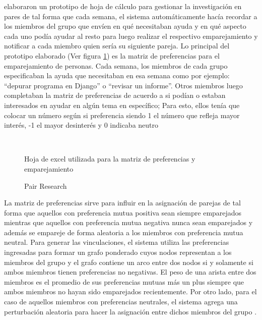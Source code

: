  elaboraron un prototipo de hoja de cálculo para gestionar la investigación en pares de tal forma que cada semana, el sistema automáticamente hacía recordar a los miembros del grupo que envíen en qué necesitaban ayuda y en qué aspecto cada uno podía ayudar al resto para luego realizar el respectivo emparejamiento y notificar a cada miembro quien sería su siguiente pareja. Lo principal del prototipo elaborado (Ver figura \ref{fig:pair_research}) es la matriz de preferencias para el emparejamiento de personas. Cada semana, los miembros de cada grupo especificaban la ayuda que necesitaban en esa semana como por ejemplo: ``depurar programa en Django'' o ``revisar un informe''. Otros miembros luego completaban la matriz de preferencias de acuerdo a si podían o estaban interesados en ayudar en algún tema en específico; Para esto, ellos tenía que colocar un número según si preferencia siendo 1 el número que refleja mayor interés, -1 el mayor desinterés y 0 indicaba neutro \cite{miller_pair_2014} \\

\begin{figure}[h]
  \centering
  \\
  \caption{Pair Research}{Hoja de excel utilizada para la matriz de preferencias y emparejamiento \protect\cite{miller_pair_2014}}
  \label{fig:pair_research}
\end{figure}

La matriz de preferencias sirve para influir en la asignación de parejas de tal forma que aquellos con preferencia mutua positiva sean siempre emparejados mientras que aquellos con preferencia mutua negativa nunca sean emparejados y además se empareje de forma aleatoria a los miembros con preferencia mutua neutral. Para generar las vinculaciones, el sistema utiliza las preferencias ingresadas para formar un grafo ponderado cuyos nodos representan a los miembros del grupo y el grafo contiene un arco entre dos nodos si y solamente si ambos miembros tienen preferencias no negativas. El peso de una arista entre dos miembros es el promedio de sus preferencias mutuas más un plus siempre que ambos miembros no hayan sido emparejados recientemente. Por otro lado, para el caso de aquellos miembros con preferencias neutrales, el sistema agrega una perturbación aleatoria para hacer la asignación entre dichos miembros del grupo \cite{miller_pair_2014}.\\

